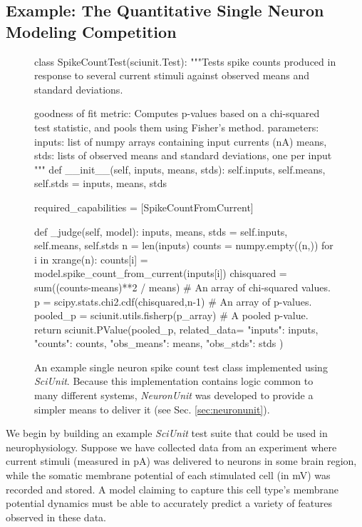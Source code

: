 \documentclass{frontiersSCNS}
\begin{document}
\subsection{Example: The Quantitative Single Neuron Modeling Competition}
\begin{figure}
\small
\begin{python}
class SpikeCountTest(sciunit.Test):
  """Tests spike counts produced in response to several current stimuli against observed means and standard deviations. 

  goodness of fit metric: Computes p-values based on a chi-squared test statistic, and pools them using Fisher's method.
  parameters:
    inputs: list of numpy arrays containing input currents (nA)
    means, stds: lists of observed means and standard deviations, one per input
  """
  def __init__(self, inputs, means, stds):
    self.inputs, self.means, self.stds = inputs, means, stds
	
  required_capabilities = [SpikeCountFromCurrent]
	
  def _judge(self, model):
    inputs, means, stds = self.inputs, self.means, self.stds
    n = len(inputs)
    counts = numpy.empty((n,))
    for i in xrange(n):
      counts[i] = model.spike_count_from_current(inputs[i])
    chisquared = sum((counts-means)**2 / means) # An array of chi-squared values.  
    p = scipy.stats.chi2.cdf(chisquared,n-1) # An array of p-values.  
    pooled_p = sciunit.utils.fisherp(p_array) # A pooled p-value.  
    return sciunit.PValue(pooled_p, related_data={
      "inputs": inputs, "counts": counts, "obs_means": means, "obs_stds": stds
    })
\end{python}
\vspace{-15px}
\caption{An example single neuron spike count test class implemented using \textit{SciUnit}. Because this implementation contains logic common to many different systems, \textit{NeuronUnit} was developed to provide a simpler means to deliver it (see Sec. \ref{sec:neuronunit}).}
\label{fig:rate_test}
\vspace{-10px}
\end{figure}

We begin by building an example \textit{SciUnit} test suite that could be used in neurophysiology. 
Suppose we have collected data from an experiment where current stimuli (measured in pA) was delivered to neurons in some brain region, while the somatic membrane potential of each stimulated cell (in mV) was recorded and stored.  
A model claiming to capture this cell type's membrane potential dynamics must be able to accurately predict a variety of features observed in these data.
\end{document}
